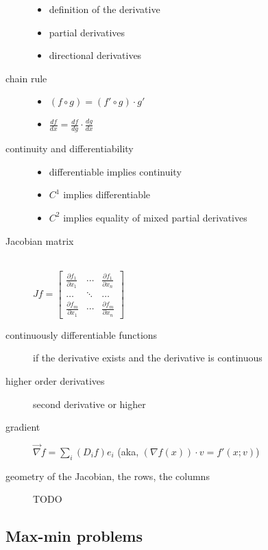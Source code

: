 \begin{description}
\item[]\hfill
	\begin{itemize}
		\item definition of the derivative
		\item partial derivatives
		\item directional derivatives
	\end{itemize}
\item[chain rule]\hfill
	\begin{itemize}
	\item$(f\circ g) = (f' \circ g)\cdot g'$
	\item$\frac{d f}{d x} = \frac{d f}{d g}\cdot \frac{d g}{d x}$
	\end{itemize}
\item[continuity and differentiability]\hfill
	\begin{itemize}
	\item differentiable implies continuity
	\item $C^1$ implies differentiable
	\item $C^2$ implies equality of mixed partial derivatives
	\end{itemize}
\item[Jacobian matrix]\hfill\\
	$
	Jf = \begin{bmatrix}
	  \frac{\partial f_1}{\partial x_1} & \cdots & \frac{\partial f_1}{\partial x_n}\\
	  \ldots & \ddots & \ldots \\
	  \frac{\partial f_m}{\partial x_1} & \cdots & \frac{\partial f_m}{\partial x_n}
	 \end{bmatrix}
	$
\item[continuously differentiable functions]
	if the derivative exists and the derivative is continuous
\item[higher order derivatives]
	second derivative or higher
\item[gradient]
	$\vec\nabla f = \sum_i (D_if)e_i$
	(aka, $(\nabla f(x)) \cdot v = f'(x;v)$)
\item[geometry of the Jacobian, the rows, the columns]TODO
\end{description}


\subsection{Max-min problems}

